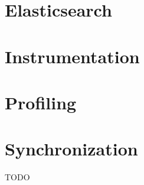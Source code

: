 
\section{Elasticsearch}

\section{Instrumentation}

%

\section{Profiling}


\section{Synchronization}


TODO


